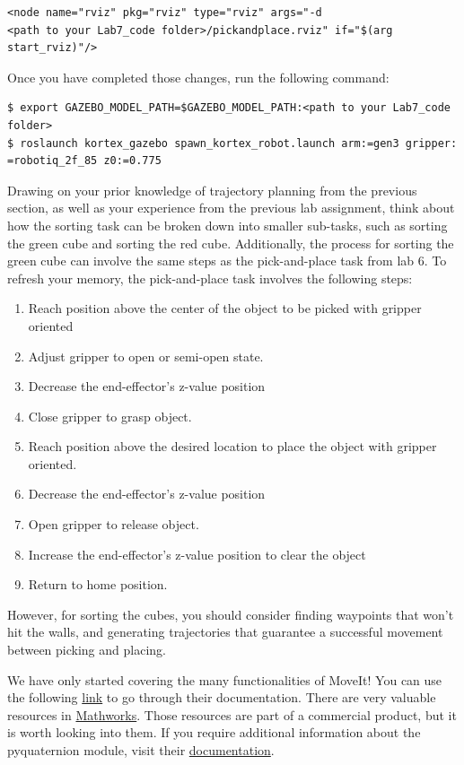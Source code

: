 \documentclass[12pt]{article}
\begin{document}
\begin{verbatim}
<node name="rviz" pkg="rviz" type="rviz" args="-d 
<path to your Lab7_code folder>/pickandplace.rviz" if="$(arg start_rviz)"/>
\end{verbatim}

Once you have completed those changes, run the following command:

\begin{verbatim}
$ export GAZEBO_MODEL_PATH=$GAZEBO_MODEL_PATH:<path to your Lab7_code folder>
$ roslaunch kortex_gazebo spawn_kortex_robot.launch arm:=gen3 gripper:
=robotiq_2f_85 z0:=0.775
\end{verbatim}

Drawing on your prior knowledge of trajectory planning from the previous section, as well as your experience from the previous lab assignment, think about how the sorting task can be broken down into smaller sub-tasks, such as sorting the green cube and sorting the red cube. Additionally, the process for sorting the green cube can involve the same steps as the pick-and-place task from lab 6. To refresh your memory, the pick-and-place task involves the following steps:

\begin{enumerate}
    \item Reach position above the center of the object to be picked with gripper oriented
    \item Adjust gripper to open or semi-open state.
    \item Decrease the end-effector’s z-value position
    \item Close gripper to grasp object.
    \item Reach position above the desired location to place the object with gripper oriented.
    \item Decrease the end-effector’s z-value position
    \item Open gripper to release object.
    \item Increase the end-effector’s z-value position to clear the object
    \item Return to home position.
    
\end{enumerate}

However, for sorting the cubes, you should consider finding waypoints that won't hit the walls, and generating trajectories that guarantee a successful movement between picking and placing.


We have only started covering the many functionalities of MoveIt! You can use the following \hyperlink{http://docs.ros.org/en/melodic/api/moveit_tutorials/html/doc/quickstart_in_rviz/quickstart_in_rviz_tutorial.html}{link} to go through their documentation.
There are very valuable resources in \hyperlink{https://www.mathworks.com/videos/trajectory-planning-for-robot-manipulators-1556705635398.html}{Mathworks}. Those resources are part of a commercial product, but it is worth looking into them.
If you require additional information about the pyquaternion module, visit their \hyperlink{http://kieranwynn.github.io/pyquaternion/}{documentation}.\\
\end{document}
